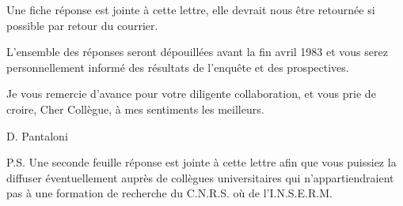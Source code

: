 Une fiche réponse est jointe à cette lettre, elle devrait nous être
retournée si possible par retour du courrier.

L'ensemble des réponses seront dépouillées avant la fin avril 1983
et vous serez personnellement informé des résultats de l'enquête et des
prospectives.

Je vous remercie d'avance pour votre diligente collaboration, et
vous prie de croire, Cher Collègue, à mes sentiments les meilleurs.

\begin{flushright}D. Pantaloni\end{flushright}


P.S. Une seconde feuille réponse est jointe à cette lettre afin que
vous puissiez la diffuser éventuellement auprès de collègues
universitaires qui n'appartiendraient pas à une formation de recherche
du C.N.R.S. où de l'I.N.S.E.R.M.
